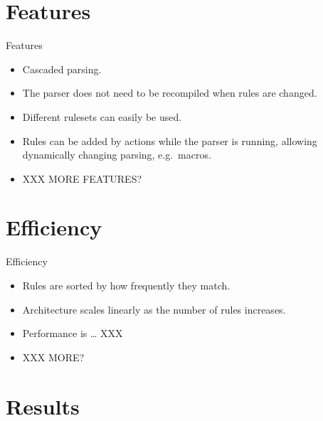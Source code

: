 \documentclass{beamer}
\begin{document}
\section{Features}

\begin{frame}{Features}

    \begin{itemize}

        \item Cascaded parsing.

        \item The parser does not need to be recompiled when rules are
            changed.

        \item Different rulesets can easily be used.

        \item Rules can be added by actions while the parser is running,
            allowing dynamically changing parsing, e.g.\ macros.

        \item XXX MORE FEATURES\@?

    \end{itemize}

\end{frame}


\section{Efficiency}

\begin{frame}{Efficiency}

    \begin{itemize}

        \item Rules are sorted by how frequently they match.

        \item Architecture scales linearly as the number of rules
            increases.

        \item Performance is \ldots{} XXX 

        \item XXX MORE\@?

    \end{itemize}

\end{frame}

\section{Results}
\end{document}
